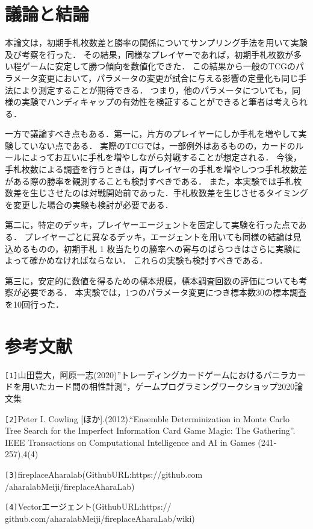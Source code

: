 \documentclass[twocolumn]{ltjsarticle}
\begin{document}
\section{議論と結論}
\small{
  本論文は，初期手札枚数差と勝率の関係についてサンプリング手法を用いて実験及び考察を行った．
  その結果，同様なプレイヤーであれば，初期手札枚数が多い程ゲームに安定して勝つ傾向を数値化できた．
  この結果から一般のTCGのパラメータ変更において，パラメータの変更が試合に与える影響の定量化も同じ手法により測定することが期待できる．
  つまり，他のパラメータについても，同様の実験でハンディキャップの有効性を検証することができると筆者は考えられる．
  
  一方で議論すべき点もある．第一に，片方のプレイヤーにしか手札を増やして実験していない点である．
  実際のTCGでは，一部例外はあるものの，カードのルールによってお互いに手札を増やしながら対戦することが想定される．
  今後，手札枚数による調査を行うときは，両プレイヤーの手札を増やしつつ手札枚数差がある際の勝率を観測することも検討すべきである．
  また，本実験では手札枚数差を生じさせたのは対戦開始前であった．手札枚数差を生じさせるタイミングを変更した場合の実験も検討が必要である．
  
  第二に，特定のデッキ，プレイヤーエージェントを固定して実験を行った点である．
  プレイヤーごとに異なるデッキ，エージェントを用いても同様の結論は見込めるものの，初期手札 1 枚当たりの勝率への寄与のばらつきはさらに実験によって確かめなければならない．
  これらの実験も検討すべきである．

  第三に，安定的に数値を得るための標本規模，標本調査回数の評価についても考察が必要である．
  本実験では，1つのパラメータ変更につき標本数30の標本調査を10回行った．

}
\section{
  参考文献
}
\small{
  \verb#[1]#山田豊大，阿原一志(2020)”トレーディングカードゲームにおけるバニラカードを用いたカード間の相性計測”，ゲームプログラミングワークショップ2020論文集

  \verb#[2]#Peter I. Cowling [ほか].(2012).“Ensemble
  Determinization in Monte Carlo Tree Search for the
  Imperfect Information Card Game Magic: The Gathering”.
  IEEE Transactions on Computational Intelligence and AI
  in Games (241-257),4(4)

  \verb#[3]#fireplaceAharalab(GithubURL:https://github.com
  /aharalabMeiji/fireplaceAharaLab)

  \verb#[4]#Vectorエージェント(GithubURL:https://
  github.com/aharalabMeiji/fireplaceAharaLab/wiki)
  

  
}
\end{document}
